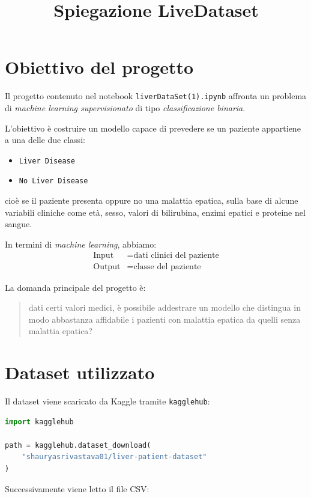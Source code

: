 \documentclass[11pt,a4paper]{article}
\title{Spiegazione LiveDataset}
\author{}
\date{}
\begin{document}
\maketitle

\section{Obiettivo del progetto}
Il progetto contenuto nel notebook \texttt{liverDataSet(1).ipynb} affronta un problema di \textit{machine learning supervisionato} di tipo \textit{classificazione binaria}.

L'obiettivo è costruire un modello capace di prevedere se un paziente appartiene a una delle due classi:
\begin{itemize}
    \item \texttt{Liver Disease}
    \item \texttt{No Liver Disease}
\end{itemize}

cioè se il paziente presenta oppure no una malattia epatica, sulla base di alcune variabili cliniche come età, sesso, valori di bilirubina, enzimi epatici e proteine nel sangue.

In termini di \textit{machine learning}, abbiamo:
\begin{align*}
    \text{Input}  &= \text{dati clinici del paziente} \\
    \text{Output} &= \text{classe del paziente}
\end{align*}

La domanda principale del progetto è:
\begin{quote}
    dati certi valori medici, è possibile addestrare un modello che distingua in modo abbastanza affidabile i pazienti con malattia epatica da quelli senza malattia epatica?
\end{quote}

\section{Dataset utilizzato}
Il dataset viene scaricato da Kaggle tramite \texttt{kagglehub}:

\begin{lstlisting}[language=Python]
import kagglehub

path = kagglehub.dataset_download(
    "shauryasrivastava01/liver-patient-dataset"
)
\end{lstlisting}

Successivamente viene letto il file CSV:
\end{document}
